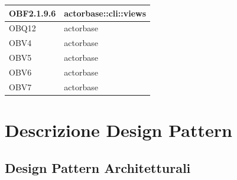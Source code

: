 \documentclass{scalatekids-article}
\begin{document}
\begin{longtable}[H]{|p{3.5cm}|p{7.5cm}|}
  \hline
  OBF2.1.9.6 & \multiLineCell[t]{actorbase::cli::views\\}\\
  \hline
  OBQ12 & \multiLineCell[t]{actorbase\\}\\
  \hline
  OBV4 & \multiLineCell[t]{actorbase\\}\\
  \hline
  OBV5 & \multiLineCell[t]{actorbase\\}\\
  \hline
  OBV6 & \multiLineCell[t]{actorbase\\}\\
  \hline
  OBV7 & \multiLineCell[t]{actorbase\\}\\
  \hline
\end{longtable}

\newpage
\appendix
\label{sec:appendice}

\section{Descrizione Design Pattern}

\subsection{Design Pattern Architetturali}
\end{document}
